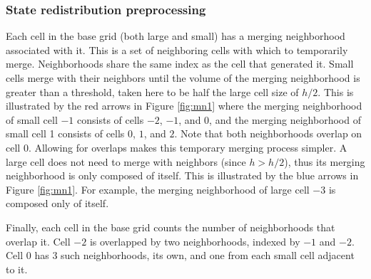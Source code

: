 \subsubsection*{State redistribution preprocessing}
Each cell in the base grid (both large and small) has a merging neighborhood
associated with it.
This is  a set of neighboring cells with which to temporarily merge.
Neighborhoods share the same index as the cell that generated it.
Small cells merge with their neighbors until the volume of the merging neighborhood is greater than
a threshold, taken here to be half the large cell size of $h/2$.
This is illustrated by the red arrows in Figure \ref{fig:mn1} where the merging neighborhood of 
small cell $-1$ consists of cells $-2$, $-1$, and $0$, and the merging neighborhood of 
small cell 1 consists of cells $0$, $1$, and $2$. 
Note that   both neighborhoods overlap on cell 0. Allowing
for overlaps makes this temporary merging process simpler.
A large cell does not need to merge with neighbors (since $h > h/2$), thus its merging neighborhood is only 
composed of itself.  This is illustrated by the blue arrows in Figure
\ref{fig:mn1}. For example,  the 
merging neighborhood of large cell $-3$ is composed only of itself.

Finally, each cell in the base grid counts the number of neighborhoods that overlap it. 
Cell $-2$ is overlapped by two neighborhoods, indexed by $-1$ and $-2$.
Cell 0 has 3 such neighborhoods, its own, and one from each small cell adjacent to it.

